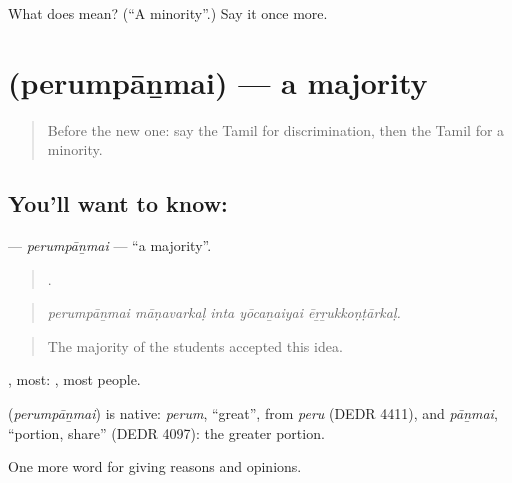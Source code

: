 \begin{tcolorbox}[breakable,colback=teal!4,colframe=teal!35!black,title={Before you move on}]
What does  mean? (\textquotedblleft{}A minority\textquotedblright{}.) Say it once more.
\end{tcolorbox}
\section[\texorpdfstring{\ta{பெரும்பான்மை} (perumpāṉmai)}{பெரும்பான்மை (perumpāṉmai)}]{ (perumpāṉmai) — a majority}

\label{lesson:TA-C371-perumpanmai}



\begin{quote}
Before the new one: say the Tamil for discrimination, then the Tamil for a minority.
\end{quote}

\subsection*{You'll want to know: }
\textbf{} — \emph{perumpāṉmai} — \textquotedblleft{}a majority\textquotedblright{}.

\begin{quote}
    .
\end{quote}

\begin{quote}
\emph{perumpāṉmai māṇavarkaḷ inta yōcaṉaiyai ēṟṟukkoṇṭārkaḷ.}
\end{quote}

\begin{quote}
The majority of the students accepted this idea.
\end{quote}

, most:  , most people.

\begin{cousinweb}
\textbf{} (\emph{perumpāṉmai}) is native: \emph{perum}, \textquotedblleft{}great\textquotedblright{}, from \emph{peru} (DEDR 4411), and \emph{pāṉmai}, \textquotedblleft{}portion, share\textquotedblright{} (DEDR 4097): the greater portion.
\end{cousinweb}

\begin{grammarlens}[title={What you've built}]
One more word for giving reasons and opinions.
\end{grammarlens}


